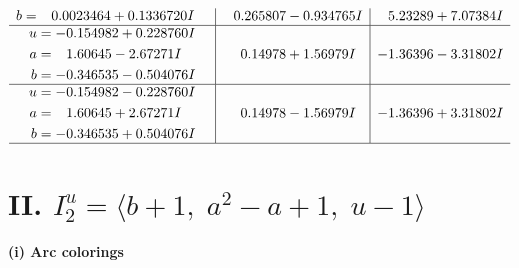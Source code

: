 \documentclass[1p]{elsarticle_modified}
\theoremstyle{definition}
\begin{document}
$$\begin{array}{c|c|c}
\begin{aligned}
b &= \phantom{-}0.0023464 + 0.1336720 I\end{aligned}
 & \phantom{-}0.265807 - 0.934765 I & \phantom{-}5.23289 + 7.07384 I \\ \hline\begin{aligned}
u &= -0.154982 + 0.228760 I \\
a &= \phantom{-}1.60645 - 2.67271 I \\
b &= -0.346535 - 0.504076 I\end{aligned}
 & \phantom{-}0.14978 + 1.56979 I & -1.36396 - 3.31802 I \\ \hline\begin{aligned}
u &= -0.154982 - 0.228760 I \\
a &= \phantom{-}1.60645 + 2.67271 I \\
b &= -0.346535 + 0.504076 I\end{aligned}
 & \phantom{-}0.14978 - 1.56979 I & -1.36396 + 3.31802 I\\
 \hline 
 \end{array}$$\newpage\newpage\renewcommand{\arraystretch}{1}
\centering \section*{II. $I^u_{2}= \langle b+1,\;a^2- a+1,\;u-1 \rangle$}
\flushleft \textbf{(i) Arc colorings}\\
\end{document}
